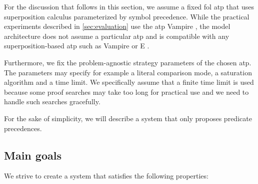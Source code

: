 For the discussion that follows in this section,
we assume a fixed \gls{fol} \gls{atp} that uses superposition calculus parameterized by symbol precedence.
While the practical experiments described in \autoref{sec:evaluation} use the \gls{atp} Vampire \cite{Kovacs2013},
the model architecture does not assume a particular \gls{atp}
and is compatible with any superposition-based \gls{atp} such as Vampire or E \cite{SCV:CADE-2019}. 

Furthermore, we fix the problem-agnostic strategy parameters of the chosen \gls{atp}.
The parameters may specify for example a literal comparison mode, a saturation algorithm
and a time limit.
We specifically assume that a finite time limit is used
because some proof searches may take too long for practical use\cite{?}
and we need to handle such searches gracefully.


For the sake of simplicity,
we will describe a system that only proposes predicate precedences.

\subsection{Main goals}

We strive to create a system that satisfies the following properties:

